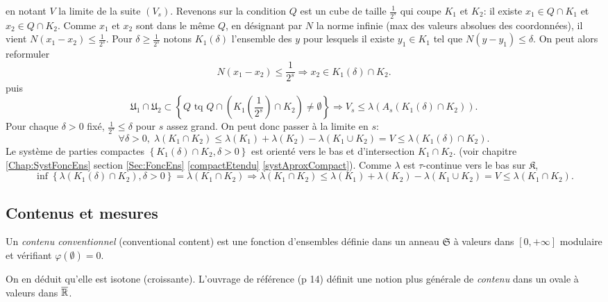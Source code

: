 \begin{demo}
en notant $V$ la limite de la suite $(V_s)$.\newline
Revenons sur la condition $Q$ est un cube de taille $\frac{1}{2^s}$ qui coupe $K_1$ et $K_2$: il existe $x_1\in Q \cap K_1$ et $x_2 \in Q \cap K_2$. Comme $x_1$ et $x_2$ sont dans le même $Q$, en désignant par $N$ la norme infinie (max des valeurs absolues des coordonnées), il vient $N(x_1-x_2)\leq \frac{1}{2^s}$. \newline
Pour $\delta \geq \frac{1}{2^s}$ notons $K_1(\delta)$ l'ensemble des $y$ pour lesquels il existe $y_1\in K_1$ tel que $N(y-y_1)\leq \delta$. On peut alors reformuler
\begin{displaymath}
 N(x_1-x_2)\leq \frac{1}{2^s} \Rightarrow x_2 \in K_1(\delta)\cap K_2.
\end{displaymath}
puis
\begin{displaymath}
 \mathfrak{U}_1 \cap \mathfrak{U}_2 \subset
 \left\lbrace Q \text{ tq } Q\cap (K_1(\frac{1}{2^s})\cap K_2 )\neq \emptyset \right\rbrace
 \Rightarrow
 V_s \leq \lambda(A_s(K_1(\delta)\cap K_2)).
\end{displaymath}
Pour chaque $\delta >0$ fixé, $\frac{1}{2^s}\leq \delta$ pour $s$  assez grand. On peut donc passer à la limite en $s$:
\begin{displaymath}
 \forall \delta > 0, \; \lambda(K_1 \cap K_2) \leq  \lambda(K_1) + \lambda(K_2) - \lambda(K_1 \cup K_2) = V \leq \lambda(K_1(\delta)\cap K_2).
\end{displaymath}
Le système de parties compactes $\left\lbrace K_1(\delta)\cap K_2, \delta > 0 \right\rbrace$ est orienté vers le bas et d'intersection $K_1 \cap K_2$. (voir chapitre \ref{Chap:SystFoncEns}  section \ref{Sec:FoncEns} \ref{compactEtendu} \ref{systAproxCompact}). Comme $\lambda$ est $\tau$-continue vers le bas sur $\mathfrak{K}$,
\begin{displaymath}
 \inf\left\lbrace \lambda(K_1(\delta)\cap K_2), \delta > 0 \right\rbrace =  \lambda(K_1 \cap K_2)
 \Rightarrow
 \lambda(K_1 \cap K_2) \leq  \lambda(K_1) + \lambda(K_2) - \lambda(K_1 \cup K_2) = V \leq \lambda(K_1 \cap K_2).
\end{displaymath}
\end{demo}


\subsection{Contenus et mesures} \label{SubSec:ContenusMesures}
\begin{defi}
Un \emph{contenu conventionnel} (conventional content)  est une fonction d'ensembles définie dans un anneau $\mathfrak{S}$ à valeurs dans $[0,+\infty]$ modulaire et vérifiant $\varphi(\emptyset)=0$.
\end{defi}
\noindent On en déduit qu'elle est isotone (croissante). L'ouvrage de référence (p 14) définit une notion plus générale de \emph{contenu} dans un ovale à valeurs dans $\overline{\mathbb{R}}$.

